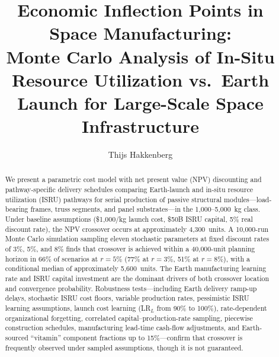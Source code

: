 \documentclass[preprint,12pt]{elsarticle}
\begin{document}
\begin{frontmatter}

\title{Economic Inflection Points in Space Manufacturing:\\ Monte Carlo Analysis of In-Situ Resource Utilization vs.\ Earth Launch for Large-Scale Space Infrastructure}

\author[dyson]{Thijs Hakkenberg}

\address[dyson]{Project Dyson, Open Research Initiative}

\begin{abstract}
We present a parametric cost model with net present value (NPV) discounting and pathway-specific delivery schedules comparing Earth-launch and in-situ resource utilization (ISRU) pathways for serial production of passive structural modules---load-bearing frames, truss segments, and panel substrates---in the 1{,}000--5{,}000~kg class. Under baseline assumptions (\$1{,}000/kg launch cost, \$50B ISRU capital, 5\% real discount rate), the NPV crossover occurs at approximately 4{,}300~units. A 10{,}000-run Monte Carlo simulation sampling eleven stochastic parameters at fixed discount rates of 3\%, 5\%, and 8\% finds that crossover is achieved within a 40{,}000-unit planning horizon in 66\% of scenarios at $r = 5\%$ (77\% at $r = 3\%$, 51\% at $r = 8\%$), with a conditional median of approximately 5{,}600~units. The Earth manufacturing learning rate and ISRU capital investment are the dominant drivers of both crossover location and convergence probability. Robustness tests---including Earth delivery ramp-up delays, stochastic ISRU cost floors, variable production rates, pessimistic ISRU learning assumptions, launch cost learning (LR$_L$ from 90\% to 100\%), rate-dependent organizational forgetting, correlated capital--production-rate sampling, piecewise construction schedules, manufacturing lead-time cash-flow adjustments, and Earth-sourced ``vitamin'' component fractions up to 15\%---confirm that crossover is frequently observed under sampled assumptions, though it is not guaranteed.


\end{abstract}
\end{frontmatter}
\end{document}
